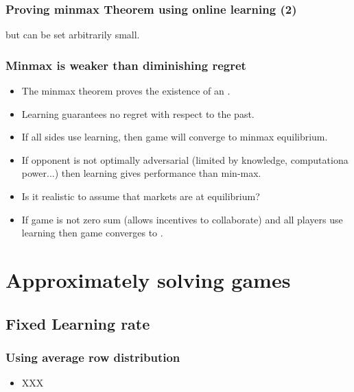 \documentclass{beamer}
\begin{document}
\begin{frame}
\frametitle{Proving minmax Theorem using online learning (2)}
\R{\em
\[
\begin{array}{rcll}
  &=&
\displaystyle{\frac{1}{T} \sumt \trans{\Pt}\M\Qt}
                       &\mbox{\rm by definition of~~\Qt}\nextline
\pause
  &\leq&
\displaystyle{\minp \frac{1}{T} \sumt \trans{\P}\M\Qt + \delt}
                       &\mbox{\rm by the Corollary} \nextline
\pause
  &=&
\displaystyle{\minp \trans{\P}\M\Qa + \delt}
                       &\mbox{\rm by definition of~~\Qa}\nextline
\pause
  &\leq&
\displaystyle{\maxq \minp \trans{\P}\M\Q + \delt.} &
\end{array}
\]
}
\pause
but \R{$\delt$} can be set arbitrarily small.

\end{frame}

\begin{frame}
\frametitle{Minmax is weaker than diminishing regret}
\begin{itemize}
\item The minmax theorem proves the existence of an .
\item Learning guarantees no regret with respect to the past.
\item If all sides use learning, then game will converge to minmax equilibrium.
\item If opponent is not optimally adversarial (limited by knowledge, computationa power...) then learning gives  performance than min-max.
\item Is it realistic to assume that markets are at equilibrium?
\item If game is not zero sum (allows incentives to collaborate) and all players
use learning then game converges to .
\end{itemize}
\end{frame}

\iffalse %

\section{Approximately solving games}

\subsection{Fixed Learning rate}
\begin{frame}
\frametitle{Using average row distribution}
\begin{itemize}
\item XXX
\end{itemize}
\end{frame}
\end{document}
